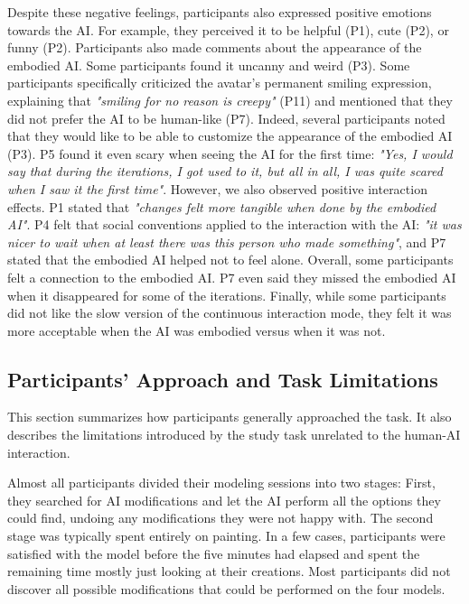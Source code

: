 Despite these negative feelings, participants also expressed positive emotions towards the AI. For example, they perceived it to be helpful (P1), cute (P2), or funny (P2). Participants also made comments about the appearance of the embodied AI. Some participants found it uncanny and weird (P3). Some participants specifically criticized the avatar's permanent smiling expression, explaining that \textit{"smiling for no reason is creepy"} (P11) and mentioned that they did not prefer the AI to be human-like (P7). Indeed, several participants noted that they would like to be able to customize the appearance of the embodied AI (P3). P5 found it even scary when seeing the AI for the first time: \textit{"Yes, I would say that during the iterations, I got used to it, but all in all, I was quite scared when I saw it the first time"}. However, we also observed positive interaction effects. P1 stated that \textit{"changes felt more tangible when done by the embodied AI"}. P4 felt that social conventions applied to the interaction with the AI: \textit{"it was nicer to wait when at least there was this person who made something"}, and P7 stated that the embodied AI helped not to feel alone. Overall, some participants felt a connection to the embodied AI. P7 even said they missed the embodied AI when it disappeared for some of the iterations. Finally, while some participants did not like the slow version of the continuous interaction mode, they felt it was more acceptable when the AI was embodied versus when it was not.












\subsection{Participants' Approach and Task Limitations}
This section summarizes how participants generally approached the task. It also describes the limitations introduced by the study task unrelated to the human-AI interaction.

Almost all participants divided their modeling sessions into two stages: First, they searched for AI modifications and let the AI perform all the options they could find, undoing any modifications they were not happy with. The second stage was typically spent entirely on painting. In a few cases, participants were satisfied with the model before the five minutes had elapsed and spent the remaining time mostly just looking at their creations. Most participants did not discover all possible modifications that could be performed on the four models.

